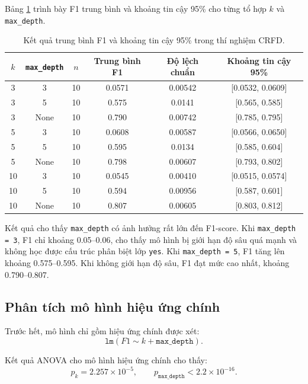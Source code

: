 \documentclass[12pt,a4paper]{article}
\begin{document}
Bảng \ref{tab:crfd_summary} trình bày F1 trung bình và khoảng tin cậy 95\% cho từng tổ hợp $k$ và \texttt{max\_depth}.

\begin{table}[H]
    \centering
    \caption{Kết quả trung bình F1 và khoảng tin cậy 95\% trong thí nghiệm CRFD.}
    \label{tab:crfd_summary}
    \begin{tabular}{cccccc}
        \toprule
        $k$ & \texttt{max\_depth} & $n$ & Trung bình F1 & Độ lệch chuẩn & Khoảng tin cậy 95\% \\
        \midrule
        3  & 3    & 10 & 0.0571 & 0.00542 & [0.0532, 0.0609] \\
        3  & 5    & 10 & 0.575  & 0.0141  & [0.565, 0.585] \\
        3  & None & 10 & 0.790  & 0.00742 & [0.785, 0.795] \\
        5  & 3    & 10 & 0.0608 & 0.00587 & [0.0566, 0.0650] \\
        5  & 5    & 10 & 0.595  & 0.0134  & [0.585, 0.604] \\
        5  & None & 10 & 0.798  & 0.00607 & [0.793, 0.802] \\
        10 & 3    & 10 & 0.0545 & 0.00410 & [0.0515, 0.0574] \\
        10 & 5    & 10 & 0.594  & 0.00956 & [0.587, 0.601] \\
        10 & None & 10 & 0.807  & 0.00605 & [0.803, 0.812] \\
        \bottomrule
    \end{tabular}
\end{table}

Kết quả cho thấy \texttt{max\_depth} có ảnh hưởng rất lớn đến F1-score. Khi \texttt{max\_depth = 3}, F1 chỉ khoảng 0.05--0.06, cho thấy mô hình bị giới hạn độ sâu quá mạnh và không học được cấu trúc phân biệt lớp \texttt{yes}. Khi \texttt{max\_depth = 5}, F1 tăng lên khoảng 0.575--0.595. Khi không giới hạn độ sâu, F1 đạt mức cao nhất, khoảng 0.790--0.807.

\subsection{Phân tích mô hình hiệu ứng chính}

Trước hết, mô hình chỉ gồm hiệu ứng chính được xét:
\[
\texttt{lm}(F1 \sim k + \texttt{max\_depth}).
\]

Kết quả ANOVA cho mô hình hiệu ứng chính cho thấy:
\[
p_k = 2.257 \times 10^{-5}, \qquad
p_{\texttt{max\_depth}} < 2.2 \times 10^{-16}.
\]
\end{document}

